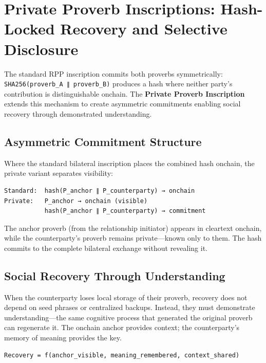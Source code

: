\documentclass[
]{article}
\begin{document}
\section{Private Proverb Inscriptions: Hash-Locked Recovery and
Selective
Disclosure}\label{private-proverb-inscriptions-hash-locked-recovery-and-selective-disclosure}

The standard RPP inscription commits both proverbs symmetrically:
\texttt{SHA256(proverb\_A\ ∥\ proverb\_B)} produces a hash where neither
party's contribution is distinguishable onchain. The \textbf{Private
Proverb Inscription} extends this mechanism to create asymmetric
commitments enabling social recovery through demonstrated understanding.

\subsection{Asymmetric Commitment
Structure}\label{asymmetric-commitment-structure}

Where the standard bilateral inscription places the combined hash
onchain, the private variant separates visibility:

\begin{verbatim}
Standard:  hash(P_anchor ∥ P_counterparty) → onchain
Private:   P_anchor → onchain (visible)
           hash(P_anchor ∥ P_counterparty) → commitment
\end{verbatim}

The anchor proverb (from the relationship initiator) appears in
cleartext onchain, while the counterparty's proverb remains
private---known only to them. The hash commits to the complete bilateral
exchange without revealing it.

\subsection{Social Recovery Through
Understanding}\label{social-recovery-through-understanding}

When the counterparty loses local storage of their proverb, recovery
does not depend on seed phrases or centralized backups. Instead, they
must demonstrate understanding---the same cognitive process that
generated the original proverb can regenerate it. The onchain anchor
provides context; the counterparty's memory of meaning provides the key.

\begin{verbatim}
Recovery = f(anchor_visible, meaning_remembered, context_shared)
\end{verbatim}
\end{document}
